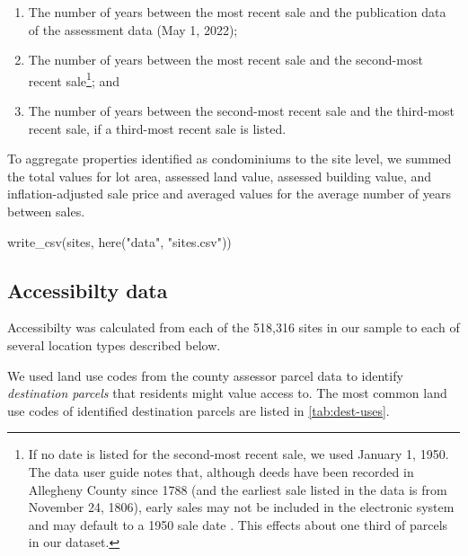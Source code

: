 \documentclass[
]{book}
\newenvironment{Shaded}{\begin{snugshade}}{\end{snugshade}}
\newcommand{\FunctionTok}[1]{\textcolor[rgb]{0.00,0.00,0.00}{#1}}
\newcommand{\NormalTok}[1]{#1}
\newcommand{\StringTok}[1]{\textcolor[rgb]{0.31,0.60,0.02}{#1}}
\providecommand{\tightlist}{%
  \setlength{\itemsep}{0pt}\setlength{\parskip}{0pt}}
\theoremstyle{definition}
\theoremstyle{definition}
\theoremstyle{definition}
\theoremstyle{definition}
\theoremstyle{remark}
\begin{document}
\begin{enumerate}
\def\labelenumi{\arabic{enumi}.}
\tightlist
\item
  The number of years between the most recent sale and the publication data of the assessment data (May 1, 2022);
\item
  The number of years between the most recent sale and the second-most recent sale\footnote{If no date is listed for the second-most recent sale, we used January 1, 1950. The data user guide notes that, although deeds have been recorded in Allegheny County since 1788 (and the earliest sale listed in the data is from November 24, 1806), early sales may not be included in the electronic system and may default to a 1950 sale date \citep{western_pennsylvania_regional_data_center_allegheny_2017}. This effects about one third of parcels in our dataset.}; and
\item
  The number of years between the second-most recent sale and the third-most recent sale, if a third-most recent sale is listed.
\end{enumerate}

To aggregate properties identified as condominiums to the site level, we summed
the total values for lot area, assessed land value, assessed building value, and
inflation-adjusted sale price and averaged values for the average number of
years between sales.

\begin{Shaded}
\begin{Highlighting}[]
\FunctionTok{write\_csv}\NormalTok{(sites,}
          \FunctionTok{here}\NormalTok{(}\StringTok{"data"}\NormalTok{,}
               \StringTok{"sites.csv"}\NormalTok{))}
\end{Highlighting}
\end{Shaded}

\hypertarget{accessibilty-data}{%
\subsection{Accessibilty data}\label{accessibilty-data}}

Accessibilty was calculated from each of the 518,316 sites in our sample to
each of several location types described below.

We used land use codes from the county assessor parcel data to identify
\emph{destination parcels} that residents might value access to. The most common
land use codes of identified destination parcels are listed in \ref{tab:dest-uses}.
\end{document}
